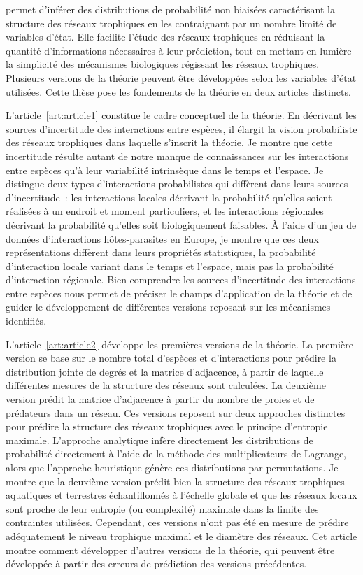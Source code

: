 \documentclass[12pt,twoside,phd]{dms}
\numberwithin{equation}{section}
\numberwithin{table}{chapter}
\numberwithin{figure}{chapter}
\begin{document}
permet d'inférer des distributions de
probabilité non biaisées caractérisant la structure des réseaux trophiques en
les contraignant par un nombre limité de variables d'état. Elle facilite l'étude
des réseaux trophiques en réduisant la quantité d'informations nécessaires à
leur prédiction, tout en mettant en lumière la simplicité des mécanismes
biologiques régissant les réseaux trophiques. Plusieurs versions de la théorie
peuvent être développées selon les variables d'état utilisées. Cette thèse pose
les fondements de la théorie en deux articles distincts. 

L'article~\ref{art:article1} constitue le cadre conceptuel de la théorie. En
décrivant les sources d'incertitude des interactions entre espèces, il élargit
la vision probabiliste des réseaux trophiques dans laquelle s'inscrit la
théorie. Je montre que cette incertitude résulte autant de notre manque de
connaissances sur les interactions entre espèces qu'à leur variabilité
intrinsèque dans le temps et l'espace. Je distingue deux types d'interactions
probabilistes qui diffèrent dans leurs sources d'incertitude~: les interactions
locales décrivant la probabilité qu'elles soient réalisées à un endroit et
moment particuliers, et les interactions régionales décrivant la probabilité
qu'elles soit biologiquement faisables. À l'aide d'un jeu de données
d'interactions hôtes-parasites en Europe, je montre que ces deux représentations
diffèrent dans leurs propriétés statistiques, la probabilité d'interaction
locale variant dans le temps et l'espace, mais pas la probabilité d'interaction
régionale. Bien comprendre les sources d'incertitude des interactions entre
espèces nous permet de préciser le champs d'application de la théorie et de
guider le développement de différentes versions reposant sur les mécanismes
identifiés. 

L'article~\ref{art:article2} développe les premières versions de la théorie. La
première version se base sur le nombre total d'espèces et d'interactions pour
prédire la distribution jointe de degrés et la matrice d'adjacence, à partir de
laquelle différentes mesures de la structure des réseaux sont calculées. La
deuxième version prédit la matrice d'adjacence à partir du nombre de proies et
de prédateurs dans un réseau. Ces versions reposent sur deux approches
distinctes pour prédire la structure des réseaux trophiques avec le principe
d'entropie maximale. L'approche analytique infère directement les distributions
de probabilité directement à l'aide de la méthode des multiplicateurs de
Lagrange, alors que l'approche heuristique génère ces distributions par
permutations. Je montre que la deuxième version prédit bien la structure des
réseaux trophiques aquatiques et terrestres échantillonnés à l'échelle globale
et que les réseaux locaux sont proche de leur entropie (ou complexité) maximale
dans la limite des contraintes utilisées. Cependant, ces versions n'ont pas été
en mesure de prédire adéquatement le niveau trophique maximal et le diamètre des
réseaux. Cet article montre comment développer d'autres versions de la théorie,
qui peuvent être développée à partir des erreurs de prédiction des versions
précédentes. 
\end{document}

